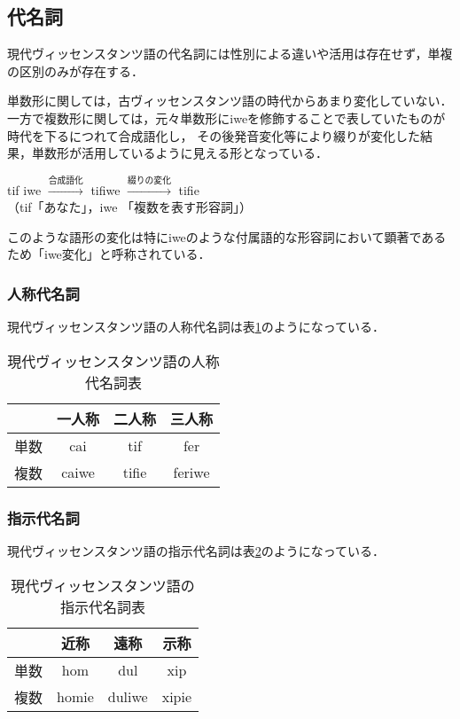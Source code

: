 \documentclass[uplatex,a4paper]{jsarticle}
\begin{document}
\subsection{代名詞}
現代ヴィッセンスタンツ語の代名詞には性別による違いや活用は存在せず，単複の区別のみが存在する．

単数形に関しては，古ヴィッセンスタンツ語の時代からあまり変化していない．
一方で複数形に関しては，元々単数形にiweを修飾することで表していたものが時代を下るにつれて合成語化し，
その後発音変化等により綴りが変化した結果，単数形が活用しているように見える形となっている．
\begin{screen}
 \begin{center}
  tif iwe $\xrightarrow{\text{合成語化}}$ tifiwe $\xrightarrow{\text{綴りの変化}}$ tifie \\
  （tif「あなた」，iwe 「複数を表す形容詞」）
 \end{center}
\end{screen}
このような語形の変化は特にiweのような付属語的な形容詞において顕著であるため「iwe変化」と呼称されている．

\subsubsection{人称代名詞}
現代ヴィッセンスタンツ語の人称代名詞は表\ref{vic_human_pronoum}のようになっている．
\begin{table}[htbp]
 \caption{現代ヴィッセンスタンツ語の人称代名詞表}
 \label{vic_human_pronoum}
 \begin{center}
  \begin{tabular}{|c||c|c|c|} \hline
   & 一人称 & 二人称 & 三人称 \\ \hline \hline
   単数 & cai & tif & fer \\ \hline
   複数 & caiwe & tifie & feriwe \\ \hline
  \end{tabular}
 \end{center}
\end{table}

\subsubsection{指示代名詞}
現代ヴィッセンスタンツ語の指示代名詞は表\ref{vic_obj_pronoum}のようになっている．
\begin{table}[htbp]
 \caption{現代ヴィッセンスタンツ語の指示代名詞表}
 \label{vic_obj_pronoum}
 \begin{center}
  \begin{tabular}{|c||c|c|c|} \hline
   & 近称 & 遠称 & 示称 \\ \hline \hline
   単数 & hom & dul & xip \\ \hline
   複数 & homie & duliwe & xipie \\ \hline
  \end{tabular}
 \end{center}
\end{table}
\end{document}
